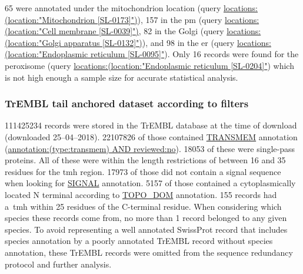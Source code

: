 65 were annotated under the mitochondrion location (query \url{locations:(location:"Mitochondrion [SL-0173]")}), 157 in the \gls{pm} (query \url{locations:(location:"Cell membrane [SL-0039]")}, 82 in the Golgi (query \url{locations:(location:"Golgi apparatus [SL-0132]")}), and 98 in the \gls{er} (query \url{locations:(location:"Endoplasmic reticulum [SL-0095]"}).
Only 16 records were found for the peroxisome (query \url{locations:(location:"Endoplasmic reticulum [SL-0204]"}) which is not high enough a sample size for accurate statistical analysis.


\subsubsection{TrEMBL tail anchored dataset according to filters}
111425234 records were stored in the TrEMBL database at the time of download (downloaded 25--04--2018).
22107826 of those contained \url{TRANSMEM} annotation (\url{annotation:(type:transmem) AND reviewed:no}).
18053 of these were single\--pass proteins.
All of these were within the length restrictions of between 16 and 35 residues for the \gls{tmh} region.
17973 of those did not contain a signal sequence when looking for \url{SIGNAL} annotation.
5157 of those contained a cytoplasmically located N terminal according to \url{TOPO_DOM} annotation.
155 records had a~\gls{tmh} within 25 residues of the C\--terminal residue.
When considering which species these records come from, no more than 1 record belonged to any given species.
To avoid representing a well annotated SwissProt record that includes species annotation by a poorly annotated TrEMBL record without species annotation, these TrEMBL records were omitted from the sequence redundancy protocol and further analysis.

